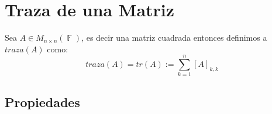 \documentclass[12pt, fleqn]{report}                             %
\theoremstyle{break}                                            %
\DeclareMathOperator \GenericField {\mathbb{F}}                 %
\begin{document}
        \clearpage
        \section{Traza de una Matriz}

            Sea $A \in M_{n \times n}(\GenericField)$, es decir una matriz cuadrada entonces
            definimos a $traza(A)$ como:
            \begin{equation*}
                traza(A) 
                    = tr(A)
                    := \sum_{k = 1}^n [A]_{k, k}
            \end{equation*}


            \subsection{Propiedades}
\end{document}
